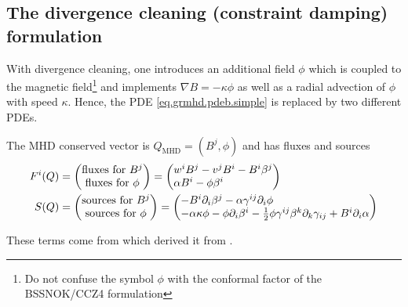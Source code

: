 \documentclass[a4paper]{article}
\newcommand{\desc}[1]{\text{#1}\quad}
\newcommand{\mhd}{\text{MHD}}
\newenvironment{pvector}{\begin{pmatrix*}[l]}{\end{pmatrix*}}
\begin{document}
\subsection{The divergence cleaning (constraint damping) formulation}

With divergence cleaning, one introduces an additional field $\phi$
which is coupled to the magnetic field\footnote{Do not confuse the
symbol $\phi$ with the conformal factor of the BSSNOK/CCZ4 formulation}
and implements $\nabla B = - \kappa \phi$ as well as a radial advection
of $\phi$ with speed $\kappa$.
Hence, the PDE \eqref{eq.grmhd.pdeb.simple} is replaced by two
different PDEs.

The MHD conserved vector is $Q_\mhd = (B^j, \phi)$ and has
fluxes and sources
\begin{align}
F^i(Q) &= \begin{pmatrix}
\text{fluxes for }B^j \\
\text{fluxes for }\phi
\end{pmatrix}
=
\begin{pvector}
w^i B^j - v^j B^i - B^i \beta^j \\
\alpha B^i - \phi \beta^i
\end{pvector}
\\
S(Q) &=
\begin{pmatrix}
\text{sources for } B^j \\
\text{sources for } \phi
\end{pmatrix}
=
\begin{pvector}
-B^i \partial_i \beta^j - \alpha \gamma^{ij} \partial_i \phi \\
- \alpha \kappa \phi - \phi \partial_i \beta^i
- \frac 12 \phi \gamma^{ij} \beta^k \partial_k \gamma_{ij}
+ B^i \partial_i \alpha
\end{pvector}
\end{align}

These terms come from \cite{BHAC} which derived it from
\cite{divclean1, divclean2}.
\end{document}
